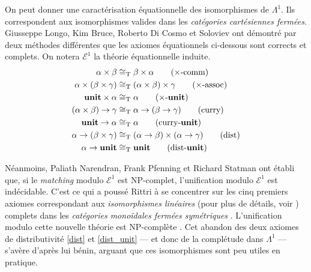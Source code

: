 \documentclass[a4paper]{report}
\theoremstyle{definition}
\newcommand{\unit}{\bold{unit}}
\newcommand{\E}{\mathscr{E}}
\newcommand{\T}{\mathrm{T}}
\newcommand\laure[1]{{\bf\color{WildStrawberry}{TODO: #1}}\\}
\begin{document}
On peut donner une caractérisation équationnelle des isomorphismes de $\Lambda^1$. Ils correspondent aux isomorphismes valides dans les \emph{catégories cartésiennes fermées}. Giusseppe Longo, Kim Bruce, Roberto Di Cosmo \cite{Bruce_DiCosmo_Longo} et Soloviev \cite{Soloviev83} ont démontré par deux méthodes différentes que les axiomes équationnels ci-dessous sont corrects et complets. On notera $\E^1$ la théorie équationnelle induite.
\begin{align}
    \alpha \times \beta &\cong_\T
    \beta \times \alpha
    \label{prod_comm}
    \tag{$\times$-comm}
  \\
    \alpha \times (\beta \times \gamma) &\cong_\T
    (\alpha \times \beta) \times \gamma
    \label{prod_assoc}
    \tag{$\times$-assoc}
  \\
    \unit \times \alpha &\cong_\T
    \alpha
    \label{prod_unit}
    \tag{$\times$-$\unit$}
  \\
    (\alpha \times \beta) \rightarrow \gamma &\cong_\T
    \alpha \rightarrow (\beta \rightarrow \gamma)
    \label{curry}
    \tag{curry}
  \\
    \unit \rightarrow \alpha &\cong_\T
    \alpha
    \label{curry_unit}
    \tag{curry-$\unit$}
  \\
    \alpha \rightarrow (\beta \times \gamma) &\cong_\T
    (\alpha \rightarrow \beta) \times (\alpha \rightarrow \gamma)
    \label{dist}
    \tag{dist}
  \\
    \alpha \rightarrow \unit &\cong_\T
    \unit
    \label{dist_unit}
    \tag{dist-$\unit$}
\end{align}

Néanmoins, Paliath Narendran, Frank Pfenning et Richard Statman \cite{Narendran_Pfenning_Statman} ont établi que, si le \emph{matching} modulo $\E^1$ est NP-complet, l'unification modulo $\E^1$ est indécidable. C'est ce qui a poussé Rittri \cite{Rittri93} à se concentrer sur les cinq premiers axiomes correspondant aux \emph{isomorphismes linéaires} (pour plus de détails, voir \cite{Rittri93}) complets dans les \emph{catégories monoïdales fermées symétriques} \cite{Soloviev93}. L'unification modulo cette nouvelle théorie est NP-complète \cite{Narendran_Pfenning_Statman}. Cet abandon des deux axiomes de distributivité \eqref{dist} et \eqref{dist_unit} — et donc de la complétude dans $\Lambda^1$ — s'avère d'après lui bénin, arguant que ces isomorphismes sont peu utiles en pratique.\laure{phrase non grammaticalement correcte}

\end{document}
